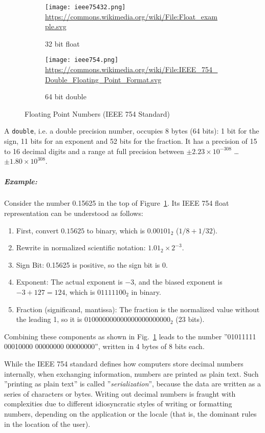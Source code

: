 \begin{figure}[h]
\centering
\begin{subfigure}[t]{\textwidth}
\centering
\texttt{[image: ieee75432.png]}\\ \vspace{5mm}
\scriptsize{\url{https://commons.wikimedia.org/wiki/File:Float_example.svg}}
\caption{32 bit float}
\end{subfigure}
\begin{subfigure}[t]{\textwidth}
\centering
\texttt{[image: ieee754.png]}
\scriptsize{\url{https://commons.wikimedia.org/wiki/File:IEEE_754_Double_Floating_Point_Format.svg}}
\caption{64 bit double}
\end{subfigure}
\caption{Floating Point Numbers (IEEE 754 Standard)}
\label{fig:ieee754}
\end{figure}

A \texttt{double}, i.e. a double precision number, occupies 8 bytes (64 bits): 1 bit for the sign, 11 bits for an exponent and 52 bits for the fraction. It has a precision of 15 to 16 decimal digits and a range at full precision between $\pm 2.23 \times 10^{-308}$ \ldots $\pm 1.80 \times 10^{308}$. 

\subparagraph*{Example:} Consider the number 0.15625 in the top of Figure~\ref{fig:ieee754}. Its IEEE 754 float representation can be understood as follows:
\begin{enumerate}
	\item First, convert $0.15625$ to binary, which is $0.00101_2$ ($1/8+1/32$).
	\item Rewrite in normalized scientific notation: $1.01_2 \times 2^{-3}$.
	\item Sign Bit: 0.15625 is positive, so the sign bit is 0.
	\item Exponent: The actual exponent is $-3$, and the biased exponent is $-3+127=124$, which is $01111100_2$ in binary.
	\item Fraction (significand, mantissa): The fraction is the normalized value without the leading 1, so it is $010000000000000000000000_2$ (23 bits).
\end{enumerate}

Combining these components as shown in Fig.~\ref{fig:ieee754} leads to the number ''01011111 00010000 00000000 00000000'', written in 4 bytes of 8 bits each.

While the IEEE 754 standard defines how computers store decimal numbers internally, when exchanging information, numbers are printed as plain text. Such ''printing as plain text'' is called ''\emph{serialization}'', because the data are written as a series of characters or bytes. Writing out decimal numbers is fraught with complexities due to different idiosyncratic styles of writing or formatting numbers, depending on the application or the locale (that is, the dominant rules in the location of the user). 

